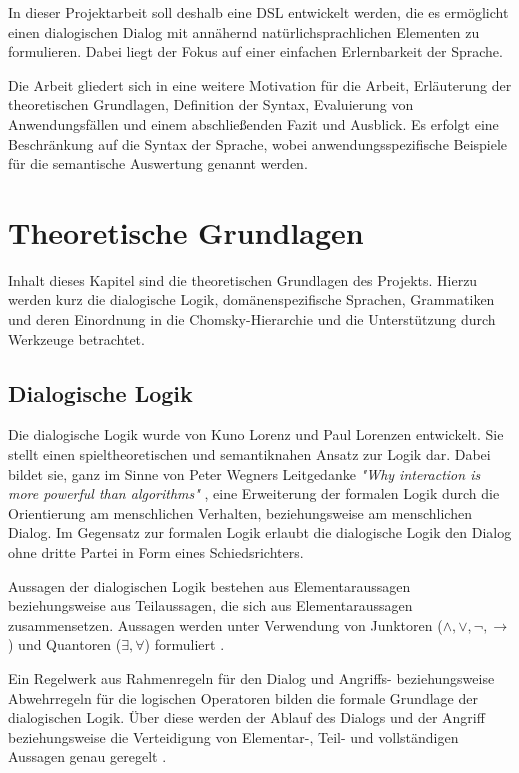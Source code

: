 \documentclass[11pt,a4paper,bibtotocnumbered]{scrreprt}
\begin{document}
In dieser Projektarbeit soll deshalb eine \ac{DSL} entwickelt werden, die es ermöglicht einen dialogischen Dialog mit annähernd natürlichsprachlichen Elementen zu formulieren. 
Dabei liegt der Fokus auf einer einfachen Erlernbarkeit der Sprache.

Die Arbeit gliedert sich in eine weitere Motivation für die Arbeit, Erläuterung der theoretischen Grundlagen, Definition der Syntax, Evaluierung von Anwendungsfällen und einem abschließenden Fazit und Ausblick.
Es erfolgt eine Beschränkung auf die Syntax der Sprache, wobei anwendungsspezifische Beispiele für die semantische Auswertung genannt werden.

\chapter{Theoretische Grundlagen}  %
Inhalt dieses Kapitel sind die theoretischen Grundlagen des Projekts. Hierzu werden kurz die dialogische Logik, domänenspezifische Sprachen, Grammatiken und deren Einordnung in die Chomsky-Hierarchie und die Unterstützung durch Werkzeuge betrachtet.

\section{Dialogische Logik}
Die dialogische Logik wurde von Kuno Lorenz und Paul Lorenzen entwickelt. Sie stellt einen spieltheoretischen und semantiknahen Ansatz zur Logik dar. Dabei bildet sie, ganz im Sinne von Peter Wegners Leitgedanke \emph{"Why interaction is more powerful than algorithms"} \cite{WegnerInteraction}, eine Erweiterung der formalen Logik durch die Orientierung am menschlichen Verhalten, beziehungsweise am menschlichen Dialog.
Im Gegensatz zur formalen Logik erlaubt die dialogische Logik den Dialog ohne dritte Partei in Form eines Schiedsrichters.

Aussagen der dialogischen Logik bestehen aus Elementaraussagen beziehungsweise aus Teilaussagen, die sich aus Elementaraussagen zusammensetzen. Aussagen werden unter Verwendung von Junktoren ($\land, \lor, \lnot, \to$) und Quantoren ($\exists, \forall$) formuliert \cite{StanfordDL}.

Ein Regelwerk aus Rahmenregeln für den Dialog und Angriffs- beziehungsweise Abwehrregeln für die logischen Operatoren bilden die formale Grundlage der dialogischen Logik. Über diese werden der Ablauf des Dialogs und der Angriff beziehungsweise die Verteidigung von Elementar-, Teil- und vollständigen Aussagen genau geregelt \cite{StanfordDL}.
\end{document}
